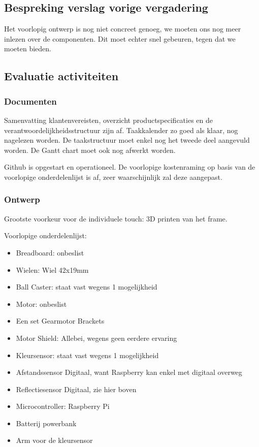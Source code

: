 \documentclass[a4paper,kulak]{kulakarticle} %
\begin{document}
\subsection{Bespreking verslag vorige vergadering}
Het voorlopig ontwerp is nog niet concreet genoeg, we moeten ons nog meer inlezen over de componenten. Dit moet echter snel gebeuren, tegen dat we moeten bieden.


\subsection{Evaluatie activiteiten}

\subsubsection{Documenten}

Samenvatting klantenvereisten, overzicht productspecificaties en de verantwoordelijkheidsstructuur zijn af. Taakkalender zo goed als klaar, nog nagelezen worden. De taakstructuur moet enkel nog het tweede deel aangevuld worden. De Gantt chart moet ook nog afwerkt worden.

Github is opgestart en operationeel.  De voorlopige kostenraming op basis van de voorlopige onderdelenlijst is af, zeer waarschijnlijk zal deze aangepast.

 
\subsubsection{Ontwerp}
Grootste voorkeur voor de individuele touch: 3D printen van het frame.

Voorlopige onderdelenlijst:
\begin{itemize}
	\item Breadboard: onbeslist
	\item Wielen: Wiel 42x19mm
	\item Ball Caster: staat vast wegens 1 mogelijkheid
	\item Motor: onbeslist
	\item Een set Gearmotor Brackets
	\item Motor Shield: Allebei, wegens geen eerdere ervaring
	\item Kleursensor: staat vast wegens 1 mogelijkheid
	\item Afstandssensor Digitaal, want Raspberry kan enkel met digitaal overweg 
	\item Reflectiesensor Digitaal, zie hier boven
	\item Microcontroller: Raspberry Pi
	\item Batterij powerbank
	\item Arm voor de kleursensor
	
	
\end{itemize}
\end{document}
